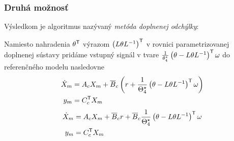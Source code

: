 \documentclass[a4paper, 10pt, ]{article}
\begin{document}
\subsubsection{Druhá možnosť}

Výsledkom je algoritmus nazývaný \emph{metóda doplnenej odchýlky}:

Namiesto nahradenia $\theta^{\mathsf{T}}$ výrazom $\left( L \theta L^{-1} \right)^{\mathsf{T}}$ v rovnici parametrizovanej doplnenej sústavy pridáme vstupný signál v tvare $\frac{1}{\theta_4^\star} \left( \theta - L \theta L^{-1} \right)^{\mathsf{T}} \omega$ do referenčného modelu nasledovne
\begin{subequations} \label{vvMRAC_NeminRefModelPrid}
	\begin{align}
		\dot X_m &= A_c X_m + \overline{B}_c \left( r + \frac{1}{\Theta_4^\star} \left( \theta - L \theta L^{-1} \right)^{\mathsf{T}} \omega \right) \\
		y_m &= C_c^{\mathsf{T}} X_m
	\end{align}
\end{subequations}
\begin{subequations} \label{vvMRAC_NeminRefModelPrid02}
	\begin{align}
        \dot X_m &= A_c X_m + \overline{B}_c r + \overline{B}_c \frac{1}{\Theta_4^\star} \left( \theta - L \theta L^{-1} \right)^{\mathsf{T}} \omega \\
		y_m &= C_c^{\mathsf{T}} X_m
	\end{align}
\end{subequations}
\end{document}
